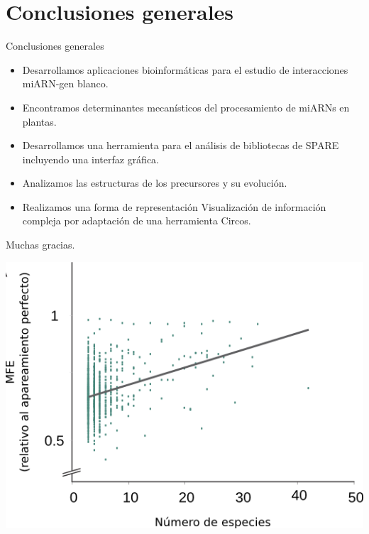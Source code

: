 \documentclass{beamer}
\begin{document}
\section{Conclusiones generales}

\begin{frame}{Conclusiones generales}
	\begin{itemize}
        \item<1-> Desarrollamos aplicaciones bioinformáticas para el estudio de interacciones miARN-gen blanco.
        \item<2-> Encontramos determinantes mecanísticos del procesamiento de miARNs en plantas.
        \item<3-> Desarrollamos una herramienta para el análisis de bibliotecas de SPARE incluyendo una interfaz gráfica.
        \item<4-> Analizamos las estructuras de los precursores y su evolución.
        \item<5-> Realizamos una forma de representación Visualización de información compleja por adaptación de una herramienta Circos.
    \end{itemize}
\end{frame}


\begin{frame}{}
	\begin{center}
		\Huge Muchas gracias.
	\end{center}
\end{frame}

\begin{frame}{}
	\begin{center}
	\end{center}
\end{frame}

\begin{frame}{}
	\begin{center}
		\includegraphics[width=.5\textwidth]{img/extras/NAR_fig3A.png}
	\end{center}
\end{frame}
\end{document}
